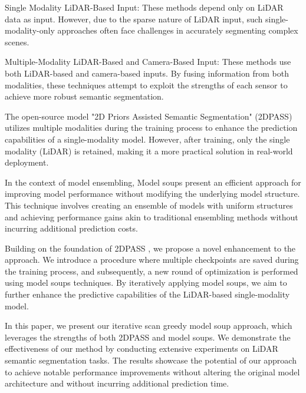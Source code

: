 \documentclass[10pt,twocolumn,letterpaper]{article}
\begin{document}
Single Modality LiDAR-Based Input: These methods depend only on LiDAR data as input. However, due to the sparse nature of LiDAR input, such single-modality-only approaches often face challenges in accurately segmenting complex scenes.\cite{chen2017deeplab,chen2017rethinking,song2017semantic,huang2019ccnet,yan2021sparse,xu2020squeezesegv3,zhu2021cylindrical,tang2020searching,zheng2022beyond,zheng2021box}

Multiple-Modality LiDAR-Based and Camera-Based Input: These methods use both LiDAR-based and camera-based inputs. By fusing information from both modalities, these techniques attempt to exploit the strengths of each sensor to achieve more robust semantic segmentation.\cite{zhuang2021perception,el2019rgb,vora2020pointpainting}

The open-source model "2D Priors Assisted Semantic Segmentation" (2DPASS)\cite{yan20222dpass} utilizes multiple modalities during the training process to enhance the prediction capabilities of a single-modality model. However, after training, only the single modality (LiDAR) is retained, making it a more practical solution in real-world deployment.

In the context of model ensembling, Model soups present an efficient approach for improving model performance without modifying the underlying model structure. This technique involves creating an ensemble of models with uniform structures and achieving performance gains akin to traditional ensembling methods without incurring additional prediction costs.

Building on the foundation of 2DPASS \cite{yan20222dpass}, we propose a novel enhancement to the approach. We introduce a procedure where multiple checkpoints are saved during the training process, and subsequently, a new round of optimization is performed using model soups techniques. By iteratively applying model soups, we aim to further enhance the predictive capabilities of the LiDAR-based single-modality model.

In this paper, we present our iterative scan greedy model soup approach, which leverages the strengths of both 2DPASS \cite{yan20222dpass} and model soups. We demonstrate the effectiveness of our method by conducting extensive experiments on LiDAR semantic segmentation tasks. The results showcase the potential of our approach to achieve notable performance improvements without altering the original model architecture and without incurring additional prediction time.
\end{document}
